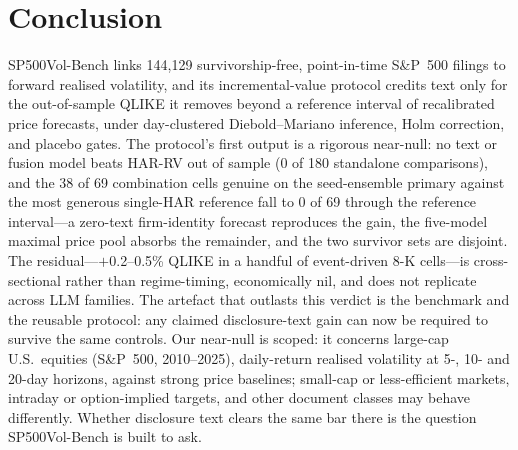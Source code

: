 \section{Conclusion}
\label{sec:conclusion}

SP500Vol-Bench links 144{,}129 survivorship-free, point-in-time S\&P~500 filings to forward realised volatility, and its incremental-value protocol credits text only for the out-of-sample QLIKE it removes beyond a reference interval of recalibrated price forecasts, under day-clustered Diebold--Mariano inference, Holm correction, and placebo gates. The protocol's first output is a rigorous near-null: no text or fusion model beats HAR-RV out of sample (0 of 180 standalone comparisons), and the 38 of 69 combination cells genuine on the seed-ensemble primary against the most generous single-HAR reference fall to 0 of 69 through the reference interval---a zero-text firm-identity forecast reproduces the gain, the five-model maximal price pool absorbs the remainder, and the two survivor sets are disjoint. The residual---$+$0.2--0.5\% QLIKE in a handful of event-driven 8-K cells---is cross-sectional rather than regime-timing, economically nil, and does not replicate across LLM families. The artefact that outlasts this verdict is the benchmark and the reusable protocol: any claimed disclosure-text gain can now be required to survive the same controls. Our near-null is scoped: it concerns large-cap U.S.\ equities (S\&P~500, 2010--2025), daily-return realised volatility at 5-, 10- and 20-day horizons, against strong price baselines; small-cap or less-efficient markets, intraday or option-implied targets, and other document classes may behave differently. Whether disclosure text clears the same bar there is the question SP500Vol-Bench is built to ask.
